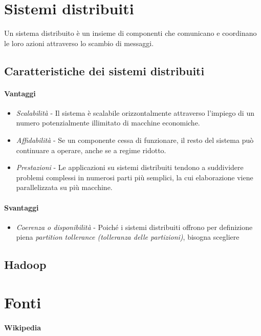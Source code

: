 \documentclass{article}
\begin{document}
\section{Sistemi distribuiti}
    Un sistema distribuito è un insieme di componenti che comunicano e coordinano le loro azioni attraverso lo scambio di messaggi.
    \subsection{Caratteristiche dei sistemi distribuiti}
        \paragraph{Vantaggi}
            \begin{itemize}
                \item \textit{Scalabilità} - Il sistema è scalabile orizzontalmente attraverso l'impiego di un numero potenzialmente illimitato di macchine economiche.
                \item \textit{Affidabilità} - Se un componente cessa di funzionare, il resto del sistema può continuare a operare, anche se a regime ridotto.
                \item \textit{Prestazioni} - Le applicazioni su sistemi distribuiti tendono a suddividere problemi complessi in numerosi parti più semplici, la cui elaborazione viene parallelizzata su più macchine.
            \end{itemize}
        \paragraph{Svantaggi}
            \begin{itemize}
                \item \textit{Coerenza o disponibilità} - Poiché i sistemi distribuiti offrono per definizione piena \textit{partition tollerance (tolleranza delle partizioni)}, bisogna scegliere 
            \end{itemize}
        
    \subsection{Hadoop}

\section{Fonti}
    \paragraph{Wikipedia}
\end{document}
